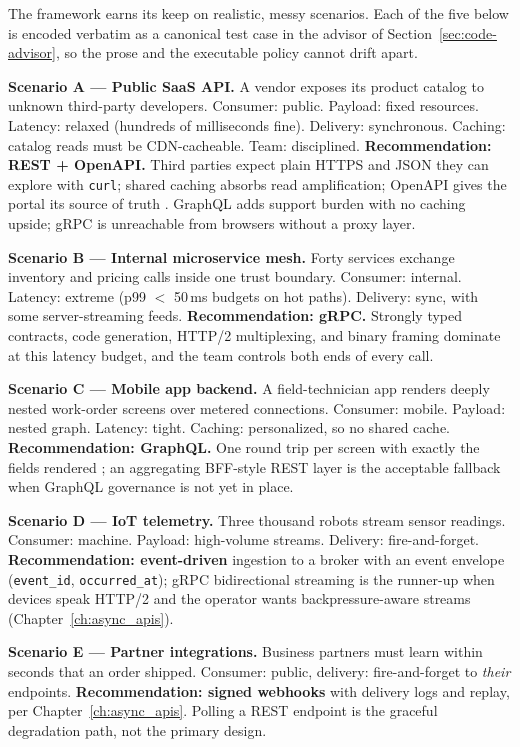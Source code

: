 The framework earns its keep on realistic, messy scenarios. Each of the five
below is encoded verbatim as a canonical test case in the advisor of
Section~\ref{sec:code-advisor}, so the prose and the executable policy cannot
drift apart.

\begin{examplebox}
\textbf{Scenario A --- Public SaaS API.} A vendor exposes its product catalog
to unknown third-party developers. Consumer: public. Payload: fixed
resources. Latency: relaxed (hundreds of milliseconds fine). Delivery:
synchronous. Caching: catalog reads must be CDN-cacheable. Team: disciplined.
\textbf{Recommendation: REST + OpenAPI.} Third parties expect plain HTTPS and
JSON they can explore with \texttt{curl}; shared caching
\cite{rfc9110} absorbs read amplification; OpenAPI gives the portal its
source of truth \cite{openapi31}. GraphQL adds support burden with no
caching upside; gRPC is unreachable from browsers without a proxy layer.
\end{examplebox}

\textbf{Scenario B --- Internal microservice mesh.} Forty services exchange
inventory and pricing calls inside one trust boundary. Consumer: internal.
Latency: extreme (p99 $<$ 50\,ms budgets on hot paths). Delivery: sync, with
some server-streaming feeds. \textbf{Recommendation: gRPC.} Strongly typed
contracts, code generation, HTTP/2 multiplexing, and binary framing
\cite{rfc9113,grpcdocs} dominate at this latency budget, and the team
controls both ends of every call.

\textbf{Scenario C --- Mobile app backend.} A field-technician app renders
deeply nested work-order screens over metered connections. Consumer: mobile.
Payload: nested graph. Latency: tight. Caching: personalized, so no shared
cache. \textbf{Recommendation: GraphQL.} One round trip per screen with
exactly the fields rendered \cite{graphqlspec}; an aggregating BFF-style REST
layer is the acceptable fallback when GraphQL governance is not yet in place.

\textbf{Scenario D --- IoT telemetry.} Three thousand robots stream sensor
readings. Consumer: machine. Payload: high-volume streams. Delivery:
fire-and-forget. \textbf{Recommendation: event-driven} ingestion to a broker
with an event envelope (\texttt{event\_id}, \texttt{occurred\_at});
gRPC bidirectional streaming is the runner-up when devices speak HTTP/2 and
the operator wants backpressure-aware streams
(Chapter~\ref{ch:async_apis}).

\textbf{Scenario E --- Partner integrations.} Business partners must learn
within seconds that an order shipped. Consumer: public, delivery:
fire-and-forget to \emph{their} endpoints. \textbf{Recommendation: signed
webhooks} with delivery logs and replay, per
Chapter~\ref{ch:async_apis}. Polling a REST endpoint is the graceful
degradation path, not the primary design.


